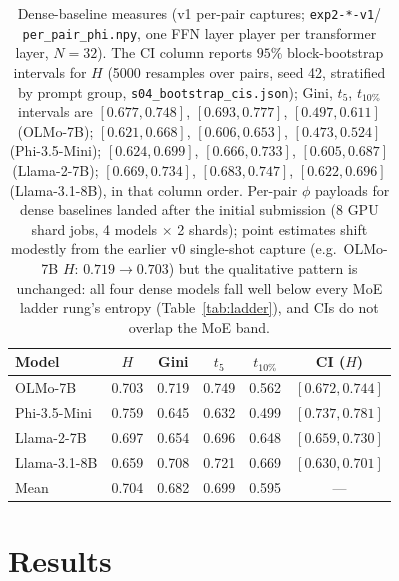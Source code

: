 \documentclass[sigconf]{acmart}
\begin{document}
\begin{table}[t]
\centering\small
\begin{tabular}{lccccc}
\toprule
Model & $H$ & Gini & $t_5$ & $t_{10\%}$ & CI ($H$) \\
\midrule
OLMo-7B        & 0.703 & 0.719 & 0.749 & 0.562 & $[0.672,0.744]$ \\
Phi-3.5-Mini   & 0.759 & 0.645 & 0.632 & 0.499 & $[0.737,0.781]$ \\
Llama-2-7B     & 0.697 & 0.654 & 0.696 & 0.648 & $[0.659,0.730]$ \\
Llama-3.1-8B   & 0.659 & 0.708 & 0.721 & 0.669 & $[0.630,0.701]$ \\
\midrule
Mean           & 0.704 & 0.682 & 0.699 & 0.595 & --- \\
\bottomrule
\end{tabular}
\caption{Dense-baseline measures (v1 per-pair captures; \texttt{exp2-*-v1}/
\texttt{per\_pair\_phi.npy}, one FFN layer player per transformer layer,
$N = 32$). The CI column reports $95\%$ block-bootstrap intervals for $H$
(5000 resamples over pairs, seed 42, stratified by prompt group,
\texttt{s04\_bootstrap\_cis.json}); Gini, $t_5$, $t_{10\%}$ intervals are
$[0.677,0.748]$, $[0.693,0.777]$, $[0.497,0.611]$ (OLMo-7B);
$[0.621,0.668]$, $[0.606,0.653]$, $[0.473,0.524]$ (Phi-3.5-Mini);
$[0.624,0.699]$, $[0.666,0.733]$, $[0.605,0.687]$ (Llama-2-7B);
$[0.669,0.734]$, $[0.683,0.747]$, $[0.622,0.696]$ (Llama-3.1-8B), in that
column order. Per-pair $\phi$ payloads for dense baselines landed after
the initial submission (8 GPU shard jobs, 4 models $\times$ 2 shards);
point estimates shift modestly from the earlier v0 single-shot capture
(e.g.\ OLMo-7B $H$: $0.719 \to 0.703$) but the qualitative pattern is
unchanged: all four dense models fall well below every MoE ladder rung's
entropy (Table~\ref{tab:ladder}), and CIs do not overlap the MoE band.}
\label{tab:dense}
\end{table}

\section{Results}
\end{document}
